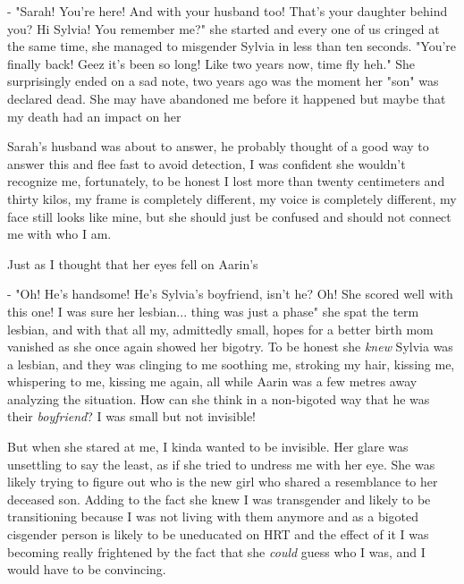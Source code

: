 \documentclass[colorlinks,12pt,a4paper]{book}
\begin{document}
 - "Sarah! You're here! And with your husband too! That's your daughter behind you? Hi Sylvia! You remember me?" she started and every one of us 
 cringed at the same time, she managed to misgender Sylvia in less than ten seconds. "You're finally back! Geez it's been so long! Like 
 two years now, time fly heh." She surprisingly ended on a sad note, two years ago was the moment her "son" was declared dead. She may have 
 abandoned me before it happened but maybe that my death had an impact on her\par 
 \bigskip
 
 Sarah's husband was about to answer, he probably thought of a good way to answer this and flee fast to avoid detection, I was 
 confident she wouldn't recognize me, fortunately, to be honest I lost more than twenty centimeters and thirty kilos, my frame is 
 completely different, my voice is completely different, my face still looks like mine, but she should just be confused and should 
 not connect me with who I am.\par 
 \bigskip 
 
 Just as I thought that her eyes fell on Aarin's\par 
 - "Oh! He's handsome! He's Sylvia's boyfriend, isn't he? Oh! She scored well with this one! I was sure her lesbian... thing was just a phase" she 
 spat the term lesbian, and with that all my, admittedly small, hopes for a better birth mom vanished as she once again showed her 
 bigotry. To be honest she \textit{knew} Sylvia was a lesbian, and they was clinging to me soothing me, stroking my hair, kissing me, whispering to me,
 kissing me again, all while Aarin was a few metres away analyzing the situation. How can she think in a non-bigoted way that he was their 
 \textit{boyfriend}? I was small but not invisible!\par 
 \bigskip
 
 But when she stared at me, I kinda wanted to be invisible. Her glare was unsettling to say the least, as if she tried to undress me 
 with her eye. She was likely trying to figure out who is the new girl who shared a resemblance to her deceased son. Adding to the fact 
 she knew I was transgender and likely to be transitioning because I was not living with them anymore and as a bigoted cisgender person is likely to be 
 uneducated on HRT and the effect of it I was becoming really frightened by the fact that she \textit{could} guess who I was, and I would have 
 to be convincing.\par 
 \bigskip 
 
\end{document}

